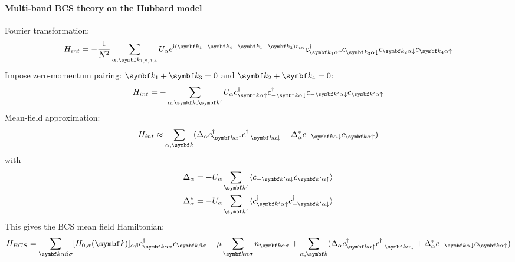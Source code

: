 \documentclass[../notes.tex]{subfiles}
\begin{document}


\cite{micnasSuperconductivityNarrowbandSystems1990}


\paragraph{Multi-band BCS theory on the Hubbard model}

Fourier transformation:
\begin{equation}
	H_{int} = - \frac{1}{N^2} \sum_{\alpha, \vb{k}_{1, 2, 3, 4}} U_{\alpha} e^{\iu (\vb{k}_1 + \vb{k}_4 - \vb{k}_1 - \vb{k}_3) r_{i \alpha}}  c_{\vb{k}_1 \alpha \uparrow}^{\dagger} c_{\vb{k}_3 \alpha \downarrow}^{\dagger} c_{\vb{k}_2 \alpha \downarrow} c_{\vb{k}_4 \alpha \uparrow}
\end{equation}
Impose zero-momentum pairing: \(\vb{k}_1 + \vb{k}_3 = 0\) and \(\vb{k}_2 + \vb{k}_4 = 0\):
\begin{align}
	H_{int} = - \sum_{\alpha, \vb{k}, \vb{k}^{\prime}} U_{\alpha} c_{\vb{k} \alpha \uparrow}^{\dagger} c_{-\vb{k} \alpha \downarrow}^{\dagger} c_{-\vb{k}^{\prime} \alpha \downarrow} c_{\vb{k}^{\prime} \alpha \uparrow}
\end{align}
Mean-field approximation:
\begin{align}
	H_{int} \approx \sum_{\alpha, \vb{k}} (\Delta_{\alpha} c_{\vb{k} \alpha \uparrow}^{\dagger} c_{-\vb{k} \alpha \downarrow}^{\dagger} + \Delta_{\alpha}^* c_{-\vb{k} \alpha \downarrow} c_{\vb{k} \alpha \uparrow})
\end{align}
with
\begin{align}
	\Delta_{\alpha} &= - U_{\alpha} \sum_{\vb{k}^{\prime}} \braket{c_{-\vb{k}^{\prime} \alpha \downarrow} c_{\vb{k}^{\prime} \alpha \uparrow}} \\
	\Delta_{\alpha}^* &= - U_{\alpha} \sum_{\vb{k}^{\prime}} \braket{c_{\vb{k}^{\prime} \alpha \uparrow}^{\dagger} c_{-\vb{k}^{\prime} \alpha \downarrow}^{\dagger}}
\end{align}
This gives the BCS mean field Hamiltonian:
\begin{align}
	H_{BCS} = \sum_{\vb{k} \alpha \beta \sigma} [H_{0, \sigma} (\vb{k})]_{\alpha \beta} c_{\vb{k} \alpha \sigma}^{\dagger} c_{\vb{k} \beta \sigma}
	-\mu \sum_{\vb{k} \alpha \sigma} n_{\vb{k} \alpha \sigma}
	+ \sum_{\alpha, \vb{k}} (\Delta_{\alpha} c_{\vb{k} \alpha \uparrow}^{\dagger} c_{-\vb{k} \alpha \downarrow}^{\dagger} + \Delta_{\alpha}^* c_{-\vb{k} \alpha \downarrow} c_{\vb{k} \alpha \uparrow})
\end{align}
\end{document}
